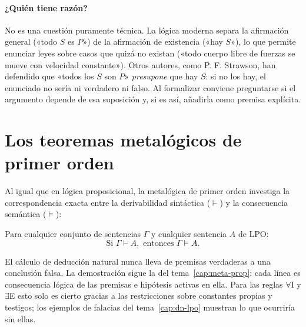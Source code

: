 \paragraph{¿Quién tiene razón?} No es una cuestión puramente técnica. La lógica moderna separa la afirmación general («todo $S$ es $P$») de la afirmación de existencia («hay $S$»), lo que permite enunciar leyes sobre casos que quizá no existan («todo cuerpo libre de fuerzas se mueve con velocidad constante»). Otros autores, como P. F. Strawson, han defendido que «todos los $S$ son $P$» \emph{presupone} que hay $S$: si no los hay, el enunciado no sería ni verdadero ni falso. Al formalizar conviene preguntarse si el argumento depende de esa suposición y, si es así, añadirla como premisa explícita.

\section{Los teoremas metalógicos de primer orden}

Al igual que en lógica proposicional, la metalógica de primer orden investiga la correspondencia exacta entre la derivabilidad sintáctica ($\vdash$) y la consecuencia semántica ($\models$):

\begin{theorem}
Para cualquier conjunto de sentencias $\Gamma$ y cualquier sentencia $A$ de LPO:
\[
\text{Si } \Gamma \vdash A, \text{ entonces } \Gamma \models A.
\]
\end{theorem}
El cálculo de deducción natural nunca lleva de premisas verdaderas a una conclusión falsa. La demostración sigue la del tema~\ref{cap:meta-prop}: cada línea es consecuencia lógica de las premisas e hipótesis activas en ella. Para las reglas $\forall$I y $\exists$E esto solo es cierto gracias a las restricciones sobre constantes propias y testigos; los ejemplos de falacias del tema~\ref{cap:dn-lpo} muestran lo que ocurriría sin ellas.

